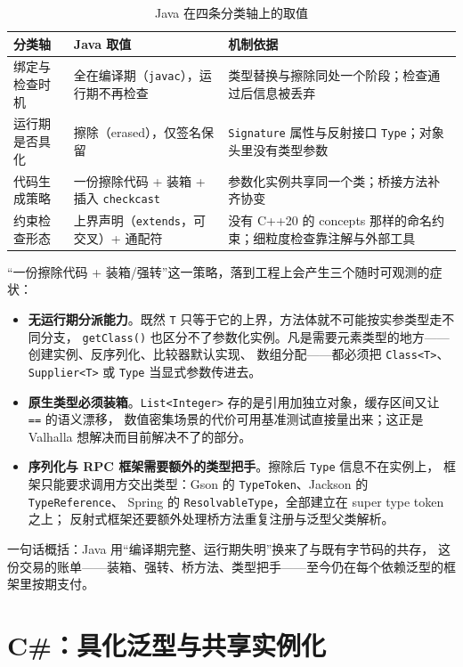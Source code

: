 \documentclass[12pt,a4paper,fontset=fandol]{ctexbook}
\newcommand{\cpp}[1]{C++#1}
\newcommand{\kw}[1]{\texttt{#1}}
\begin{document}
\begin{table}[!htbp]
\centering
\caption{Java 在四条分类轴上的取值}
\begin{tabularx}{0.80\textwidth}{>{\raggedright\arraybackslash}p{}>{\raggedright\arraybackslash}p{}>{\raggedright\arraybackslash}X}
\toprule
分类轴 & Java 取值 & 机制依据 \\
\midrule
绑定与检查时机 & 全在编译期（\kw{javac}），运行期不再检查 & 类型替换与擦除同处一个阶段；检查通过后信息被丢弃 \\
运行期是否具化 & 擦除（erased），仅签名保留 & \kw{Signature} 属性与反射接口 \kw{Type}；对象头里没有类型参数 \\
代码生成策略 & 一份擦除代码 + 装箱 + 插入 \kw{checkcast} & 参数化实例共享同一个类；桥接方法补齐协变 \\
约束检查形态 & 上界声明（\kw{extends}，可交叉）+ 通配符 & 没有 \cpp{20} 的 concepts 那样的命名约束；细粒度检查靠注解与外部工具 \\
\bottomrule
\end{tabularx}
\end{table}

“一份擦除代码 + 装箱/强转”这一策略，落到工程上会产生三个随时可观测的症状：

\begin{itemize}
  \item \textbf{无运行期分派能力}。既然 \kw{T} 只等于它的上界，方法体就不可能按实参类型走不同分支，
        \kw{getClass()} 也区分不了参数化实例。凡是需要元素类型的地方——创建实例、反序列化、比较器默认实现、
        数组分配——都必须把 \kw{Class<T>}、\kw{Supplier<T>} 或 \kw{Type} 当显式参数传进去。
  \item \textbf{原生类型必须装箱}。\kw{List<Integer>} 存的是引用加独立对象，缓存区间又让 \kw{==} 的语义漂移，
        数值密集场景的代价可用基准测试直接量出来；这正是 Valhalla 想解决而目前解决不了的部分。
  \item \textbf{序列化与 RPC 框架需要额外的类型把手}。擦除后 \kw{Type} 信息不在实例上，
        框架只能要求调用方交出类型：Gson 的 \kw{TypeToken}、Jackson 的 \kw{TypeReference}、
        Spring 的 \kw{ResolvableType}，全部建立在 super type token 之上；
        反射式框架还要额外处理桥方法重复注册与泛型父类解析。
\end{itemize}

一句话概括：Java 用“编译期完整、运行期失明”换来了与既有字节码的共存，
这份交易的账单——装箱、强转、桥方法、类型把手——至今仍在每个依赖泛型的框架里按期支付。

\chapter{C\#：具化泛型与共享实例化}
\end{document}
